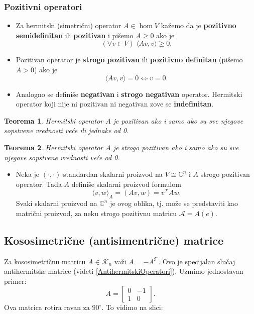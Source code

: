 \documentclass[a4paper,12pt,twoside]{report}
\newtheorem{theorem}{Teorema}[section]
\numberwithin{algorithm}{section}
\begin{document}
\subsubsection{Pozitivni operatori}
\begin{itemize}
    \item Za hermitski (simetrični) operator $A \in \hom V$ kažemo da je \textbf{pozitivno semidefinitan} ili \textbf{pozitivan} 
    i pišemo $A \geq 0$ ako je \[ (\forall v \in V) \; \langle Av, v \rangle \geq 0. \] 
    \item Pozitivan operator je \textbf{strogo pozitivan} ili \textbf{pozitivno definitan} (pišemo $A > 0$) ako je
    \[ \langle Av, v \rangle = 0 \iff v = 0. \]
    \item Analogno se definiše \textbf{negativan} i \textbf{strogo negativan} operator. Hermitski operator koji nije ni pozitivan 
    ni negativan zove se \textbf{indefinitan}.
\end{itemize}

\begin{theorem}
    Hermitski operator $A$ je pozitivan ako i samo ako su sve njegove sopstvene vrednosti veće ili jednake od 0.
\end{theorem}

\begin{theorem}
    Hermitski operator $A$ je strogo pozitivan ako i samo ako su sve njegove sopstvene vrednosti veće od 0.
\end{theorem}

\begin{itemize}
    \item Neka je $(\cdot, \cdot)$ standardan skalarni proizvod na $V \cong \mathbb{C}^n$ i $A$ strogo pozitivan operator. Tada
    $A$ definiše skalarni proizvod formulom \[ \langle v, w \rangle_A = (Av,w)=v^\mathcal{T}Aw. \]
    Svaki skalarni proizvod na $\mathbb{C}^n$ je ovog oblika, tj. može se predstaviti kao matrični proizvod, za neku strogo
    pozitivnu matricu $\mathcal{A} = A(e)$.
\end{itemize}
\newpage

\subsection{Kososimetrične (antisimentrične) matrice}
\label{AntisimetricneMatrice}
Za kososimetričnu matricu $A \in \mathcal{K}_n$ važi $A = -A^\mathcal{T}$. Ovo je specijalan slučaj antihermitske matrice (videti \ref{AntihermitskiOperatori}). 
Uzmimo jednostavan primer:
        \[A = \begin{bmatrix}
            0 & -1 \\
            1 & 0
        \end{bmatrix}.\]
        Ova matrica rotira ravan za $90^\circ$. To vidimo na slici:
\end{document}
